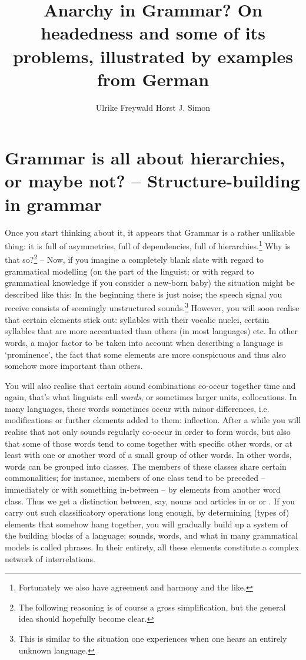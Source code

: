 \documentclass[output=paper
  ,nobabel
  ,draftmode
  ,colorlinks, citecolor=brown
]{langscibook}
\title[Anarchy in Grammar?]{Anarchy in Grammar? On headedness and some of its problems, illustrated by examples from German}
\author{Ulrike Freywald\orcid{0000-0003-3268-7874}\affiliation{TU Dortmund} \lastand Horst J. Simon\orcid{0000-0002-6367-2969}\affiliation{Freie Universität Berlin}}
\begin{document}
\maketitle

\section{Grammar is all about hierarchies, or maybe not? – Structure-building in grammar}

Once you start thinking about it, it appears that Grammar is a rather unlikable thing: it is full of
asymmetries, full of dependencies, full of hierarchies.\footnote{Fortunately we also have agreement
  and harmony and the like.} Why is that so?\footnote{The following reasoning is of course a gross
  simplification, but the general idea should hopefully become clear.} – Now, if you imagine a
completely blank slate with regard to grammatical modelling (on the part of the linguist; or with
regard to grammatical knowledge if you consider a new-born baby) the situation might be described
like this: In the beginning there is just noise; the speech signal you receive consists of seemingly
unstructured sounds.\footnote{This is similar to the situation one experiences when one hears an
  entirely unknown language.} However, you will soon realise that certain elements stick out:
syllables with their vocalic nuclei, certain syllables that are more accentuated than others (in
most languages) etc. In other words, a major factor to be taken into account when describing a
language is `prominence', the fact that some elements are more conspicuous and thus also somehow
more important than others.

You will also realise that certain sound combinations co-occur together time and again, that's what
linguists call \emph{words}, or sometimes larger units, collocations. In many languages, these
words sometimes occur with minor differences, i.e. modifications or further elements added to them:
inflection. After a while you will realise that not only sounds regularly co-occur in order to form
words, but also that some of those words tend to come together with specific other words, or at
least with one or another word of a small group of other words. In other words, words can be grouped
into classes. The members of these classes share certain commonalities; for instance, members of one
class tend to be preceded – immediately or with something in-between – by elements from another word
class. Thus we get a distinction between, say, nouns and articles in  or  or . If
you carry out such classificatory operations long enough, by determining (types of) elements that
somehow hang together, you will gradually build up a system of the building blocks of a language:
sounds, words, and what in many grammatical models is called phrases. In their entirety, all these
elements constitute a complex network of interrelations.
\end{document}
